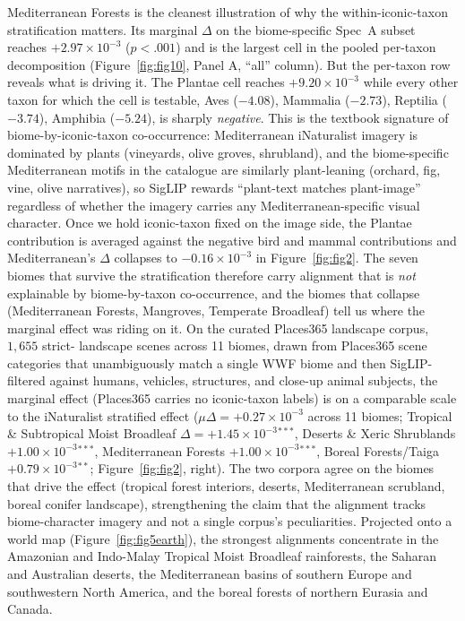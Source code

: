\documentclass[11pt,a4paper]{article}
\begin{document}
Mediterranean Forests is the cleanest illustration of why the
within-iconic-taxon stratification matters. Its marginal $\Delta$
on the biome-specific Spec~A subset reaches $+2.97 \times 10^{-3}$
($p<.001$) and is the largest cell in the pooled per-taxon
decomposition (Figure~\ref{fig:fig10}, Panel A, ``all'' column).
But the per-taxon row reveals what is driving it. The Plantae cell
reaches $+9.20 \times 10^{-3}$ while every other taxon for which
the cell is testable, Aves ($-4.08$), Mammalia ($-2.73$),
Reptilia ($-3.74$), Amphibia ($-5.24$), is sharply \emph{negative}.
This is the textbook signature of biome-by-iconic-taxon
co-occurrence: Mediterranean iNaturalist imagery is dominated by
plants (vineyards, olive groves, shrubland), and the
biome-specific Mediterranean motifs in the catalogue are
similarly plant-leaning (orchard, fig, vine, olive narratives), so
SigLIP rewards ``plant-text matches plant-image'' regardless of
whether the imagery carries any Mediterranean-specific visual
character. Once we hold iconic-taxon fixed on the image side, the
Plantae contribution is averaged against the negative bird and
mammal contributions and Mediterranean's $\Delta$ collapses to
$-0.16 \times 10^{-3}$ in Figure~\ref{fig:fig2}. The seven biomes
that survive the stratification therefore carry alignment that is
\emph{not} explainable by biome-by-taxon co-occurrence, and the
biomes that collapse (Mediterranean Forests, Mangroves, Temperate
Broadleaf) tell us where the marginal effect was riding on it. On the curated Places365 landscape corpus, $1{,}655$ strict-
landscape scenes across 11 biomes, drawn from Places365 scene
categories that unambiguously match a single WWF biome and then
SigLIP-filtered against humans, vehicles, structures, and close-up
animal subjects, the marginal effect (Places365 carries no
iconic-taxon labels) is on a comparable scale to the iNaturalist
stratified effect ($\mu\Delta = +0.27\times 10^{-3}$ across 11
biomes; Tropical \& Subtropical Moist Broadleaf
$\Delta = +1.45\times 10^{-3}$$^{***}$, Deserts \& Xeric
Shrublands $+1.00\times 10^{-3}$$^{***}$, Mediterranean Forests
$+1.00\times 10^{-3}$$^{***}$, Boreal Forests/Taiga
$+0.79\times 10^{-3}$$^{**}$; Figure~\ref{fig:fig2}, right). The
two corpora agree on the biomes that drive the effect (tropical
forest interiors, deserts, Mediterranean scrubland, boreal
conifer landscape), strengthening the claim that the alignment
tracks biome-character imagery and not a single corpus's
peculiarities. Projected onto a world map
(Figure~\ref{fig:fig5earth}), the strongest alignments concentrate
in the Amazonian and Indo-Malay Tropical Moist Broadleaf
rainforests, the Saharan and Australian deserts, the
Mediterranean basins of southern Europe and southwestern North
America, and the boreal forests of northern Eurasia and Canada.
\end{document}
